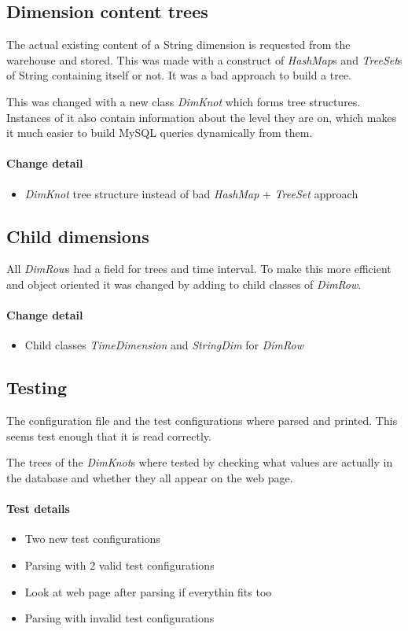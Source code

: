 \subsection{Dimension content trees}
The actual existing content of a String dimension is requested from
the warehouse and stored. This was made with a construct
of \textit{HashMap}s and \textit{TreeSet}s of String containing itself or not. It was
a bad approach to build a tree.

This was changed with a new class \textit{DimKnot} which forms tree structures. 
Instances of it also contain information about the level they are on,
which makes it much easier to build MySQL queries dynamically from them.
\paragraph{Change detail}
\begin{itemize}
  \item \textit{DimKnot} tree structure instead of bad \textit{HashMap} + \textit{TreeSet} approach
\end{itemize}


\pagebreak[4]
\subsection{Child dimensions}
All \textit{DimRow}s had a field for trees and time interval. To make this more
efficient and object oriented it was changed
by adding to child classes of \textit{DimRow}.
\paragraph{Change detail}
\begin{itemize}
  \item Child classes \textit{TimeDimension} and \textit{StringDim} for \textit{DimRow}
\end{itemize}

\subsection{Testing}

The configuration file and the test configurations where parsed and printed. 
This seems test enough that it is read correctly. 

The trees of the \textit{DimKnot}s where tested by checking what values are actually in the
database and whether they all appear on the web page.

\paragraph{Test details}
\begin{itemize}
  \item Two new test configurations
  \item Parsing with 2 valid test configurations
  \item Look at web page after parsing if everythin fits too
  \item Parsing with invalid test configurations
\end{itemize}


